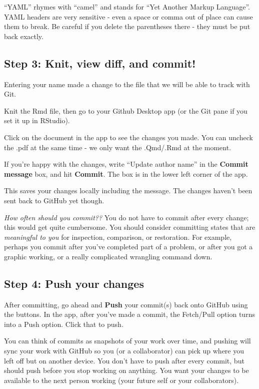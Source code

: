 \documentclass[
  letterpaper,
  DIV=11,
  numbers=noendperiod]{scrartcl}
\begin{document}
``YAML'' rhymes with ``camel'' and stands for ``Yet Another Markup
Language''. YAML headers are very sensitive - even a space or comma out
of place can cause them to break. Be careful if you delete the
parentheses there - they must be put back exactly.

\hypertarget{step-3-knit-view-diff-and-commit}{%
\subsection{Step 3: Knit, view diff, and
commit!}\label{step-3-knit-view-diff-and-commit}}

Entering your name made a change to the file that we will be able to
track with Git.

Knit the Rmd file, then go to your Github Desktop app (or the Git pane
if you set it up in RStudio).

Click on the document in the app to see the changes you made. You can
uncheck the .pdf at the same time - we only want the .Qmd/.Rmd at the
moment.

If you're happy with the changes, write ``Update author name'' in the
\textbf{Commit message} box, and hit \textbf{Commit}. The box is in the
lower left corner of the app.

This saves your changes locally including the message. The changes
haven't been sent back to GitHub yet though.

\emph{How often should you commit??} You do not have to commit after
every change; this would get quite cumbersome. You should consider
committing states that are \emph{meaningful to you} for inspection,
comparison, or restoration. For example, perhaps you commit after you've
completed part of a problem, or after you got a graphic working, or a
really complicated wrangling command down.

\hypertarget{step-4-push-your-changes}{%
\subsection{Step 4: Push your changes}\label{step-4-push-your-changes}}

After committing, go ahead and \textbf{Push} your commit(s) back onto
GitHub using the buttons. In the app, after you've made a commit, the
Fetch/Pull option turns into a Push option. Click that to push.

You can think of commits as snapshots of your work over time, and
pushing will sync your work with GitHub so you (or a collaborator) can
pick up where you left off but on another device. You don't have to push
after every commit, but should push before you stop working on anything.
You want your changes to be available to the next person working (your
future self or your collaborators).
\end{document}
